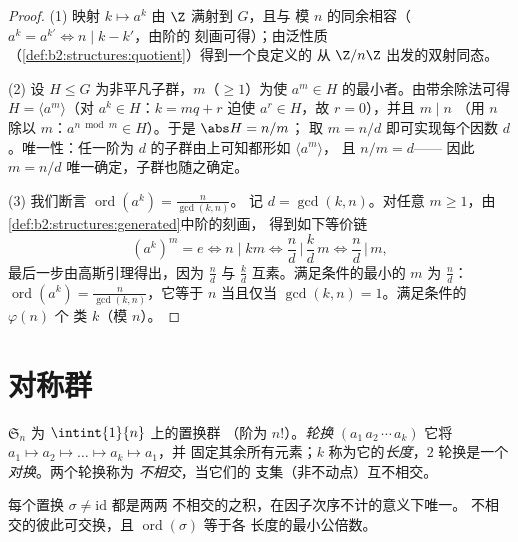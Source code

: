 \begin{proof}
(1) 映射 $k \mapsto a^k$ 由 $\Z$ 满射到 $G$，且与
模 $n$ 的同余相容（$a^{k} = a^{k'} \iff n \mid k - k'$，由阶的
刻画可得）；由泛性质
（\cref{def:b2:structures:quotient}）得到一个良定义的
从 $\Z/n\Z$ 出发的双射同态。

(2) 设 $H \leq G$ 为非平凡子群，$m$（$\geq 1$）为使 $a^m \in
H$ 的最小者。由带余除法可得 $H = \langle a^m\rangle$（对 $a^k \in
H$：$k = mq + r$ 迫使 $a^r \in H$，故 $r = 0$），并且 $m \mid n$
（用 $n$ 除以 $m$：$a^{n \bmod m} \in H$）。于是 $\abs H = n/m$；
取 $m = n/d$ 即可实现每个因数 $d$。唯一性：任一阶为
$d$ 的子群由上可知都形如 $\langle a^m \rangle$，
且 $n/m = d$——
因此 $m = n/d$ 唯一确定，子群也随之确定。

(3) 我们断言 $\operatorname{ord}(a^k) = \frac{n}{\gcd(k, n)}$。
记 $d = \gcd(k, n)$。对任意 $m \geq 1$，由
\cref{def:b2:structures:generated}中阶的刻画，
得到如下等价链
\[
(a^k)^m = e
\iff n \mid km
\iff \frac{n}{d} \,\Big|\, \frac{k}{d}\,m
\iff \frac{n}{d} \,\Big|\, m ,
\]
最后一步由高斯引理得出，因为 $\frac nd$ 与 $\frac kd$
互素。满足条件的最小的 $m$ 为 $\frac nd$：
$\operatorname{ord}(a^k) = \frac n{\gcd(k,n)}$，它等于 $n$
当且仅当 $\gcd(k, n) = 1$。满足条件的 $\varphi(n)$ 个
类 $k$（模 $n$）。
\end{proof}

\section{对称群}

\begin{definition}\label{def:b2:structures:sn}
$\mathfrak{S}_n$ 为 $\intint{1}{n}$ 上的置换群
（阶为 $n!$）。\emph{轮换} $(a_1\,a_2\,\cdots\,a_k)$
它将 $a_1 \mapsto a_2 \mapsto \dots \mapsto a_k \mapsto a_1$，并
固定其余所有元素；$k$ 称为它的\emph{长度}，$2$ 轮换是一个
\emph{对换}。两个轮换称为
\emph{不相交}，当它们的
支集（非不动点）互不相交。
\end{definition}

\begin{theorem}[轮换分解]\label{thm:b2:structures:cycles}
每个置换 $\sigma \neq \mathrm{id}$ 都是两两
不相交的之积，在因子次序不计的意义下唯一。
不相交的彼此可交换，且 $\operatorname{ord}(\sigma)$ 等于各
长度的最小公倍数。
\end{theorem}


